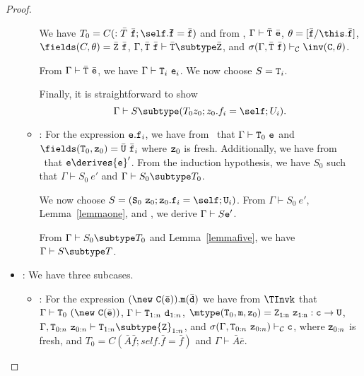 \begin{proof}
\begin{itemize}
\begin{itemize}
             We have 
             $T_0 = C(:\bar{T}\ \bar{\tt f}{\tt ;\self.\bar{f}}=\bar{\tt f})$
             and from \TNew, 
             $\Gamma \vdash \bar{\tt T}\ \bar{\tt e}$,
             $\theta=[\bar{\tt f}/\this.\bar{\tt f}]$,
             $\fields(C,\theta)=\bar{\tt Z}\ \bar{\tt f}$,
             $\Gamma, \bar{\tt T}\ \bar{\tt f} \vdash 
                   \bar{\tt T} \subtype \bar{\tt Z}$, and
             $\sigma(\Gamma, \bar{\tt T}\ \bar{\tt f}) \vdash_{\cal C} 
                   \inv({\tt C},\theta)$.

             From $\Gamma \vdash \bar{\tt T}\ \bar{\tt e}$, we have
             $\Gamma \vdash {\tt T}_i\ {\tt e}_i$.
             We now choose $S = {\tt T}_i$.

             Finally, it is straightforward to show
             $$\Gamma \vdash S \subtype (T_0 z_0; z_0.f_i = \self; U_i).$$
   \item
   \RCField: For the expression ${\tt e.f}_i$, we have from \TField\ that
             $\Gamma \vdash {\tt T}_0\ {\tt e}$ and
             $\fields({\tt T}_0,{\tt z}_0)= \bar{\tt U}\ \bar{\tt f}_i$
             where ${\tt z}_0$ is fresh.
             Additionally, we have from \RCField\ that  
             ${\tt e} \derives {{\tt e}}'$.
             From the induction hypothesis, we have $S_0$ such that 
             $\Gamma \vdash S_0\ e'$ and $\Gamma \vdash S_0 \subtype T_0$.

             We now choose 
             $S = 
               ({\tt S}_0\ {\tt z}_0; {\tt z}_0.{\tt f}_i=\self;{\tt U}_i)$.
             From $\Gamma \vdash S_0\ e'$, Lemma~\ref{lemmaone}, and
             \TField, we derive
             $\Gamma \vdash S {{\tt e}}'$.

             From $\Gamma \vdash S_0 \subtype T_0$ and 
             Lemma~\ref{lemmafive}, we have $\Gamma \vdash S \subtype T$.
   \end{itemize}
\item
\TInvk: We have three subcases.
   \begin{itemize}
   \item
   \RInvk:  For the expression 
            $(\new\ {\tt C}(\bar{\tt e})).{\tt m}(\bar{\tt d})$
            we have from $\TInvk$ that
            $\Gamma \vdash {\tt T}_0 \ (\new\ {\tt C}(\bar{\tt e}))$,
            $\Gamma \vdash {\tt T}_{1:n} \ {\tt d}_{1:n}$,
            $\mtype({\tt T}_0,{\tt m},{\tt z}_0) = 
               \tt {\tt Z}_{1:n}\ {\tt z}_{1:n}:c \rightarrow {\tt U}$,
            $\Gamma, {\tt T}_{0:n}\ {\tt z}_{0:n} \vdash 
                  {\tt T}_{1:n} \subtype {\tt Z}_{1:n}$, and
            $\sigma(\Gamma, {\tt T}_{0:n}\ {\tt z}_{0:n}) \vdash_{\cal C}                          {\tt c}$, 
            where ${\tt z}_{0:n}$ is fresh, and
            $T_0 = C(\bar{A} \bar{f}; self.\bar{f} = \bar{f})$ and
            $\Gamma \vdash \bar{A} \bar{e}$.


\end{itemize}
\end{itemize}
\end{proof}
